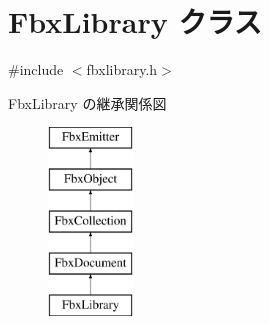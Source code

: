 \hypertarget{class_fbx_library}{}\section{Fbx\+Library クラス}
\label{class_fbx_library}


{\ttfamily \#include $<$fbxlibrary.\+h$>$}

Fbx\+Library の継承関係図\begin{figure}[H]
\begin{center}
\leavevmode
\includegraphics[height=5.000000cm]{class_fbx_library}
\end{center}
\end{figure}
